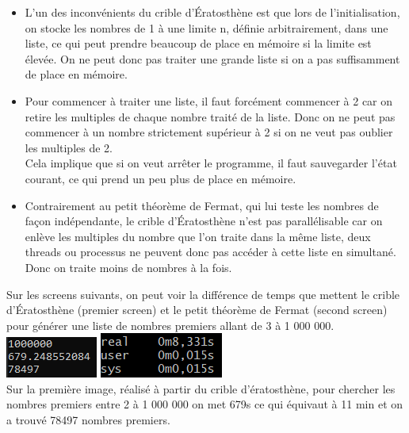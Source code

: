\begin{itemize}
\item L'un des inconvénients du crible d’Ératosthène est que lors de l'initialisation, on stocke les nombres de 1 à une limite n, définie arbitrairement, dans une liste, ce qui peut prendre beaucoup de place en mémoire si la limite est élevée. On ne peut donc pas traiter une grande liste si on a pas suffisamment de place en mémoire.\\

\item Pour commencer à traiter une liste, il faut forcément commencer à 2 car on retire les multiples de chaque nombre traité de la liste. Donc on ne peut pas commencer à un nombre strictement supérieur à 2 si on ne veut pas oublier les multiples de 2.\\
Cela implique que si on veut arrêter le programme, il faut sauvegarder l'état courant, ce qui prend un peu plus de place en mémoire.\\

\item Contrairement au petit théorème de Fermat, qui lui teste les nombres de façon indépendante, le crible d’Ératosthène n'est pas parallélisable car on enlève les multiples du nombre que l'on traite dans la même liste, deux threads ou processus ne peuvent donc pas accéder à cette liste en simultané. Donc on traite moins de nombres à la fois.\\
\end{itemize}

Sur les screens suivants, on peut voir la différence de temps que mettent le crible d’Ératosthène (premier screen) et le petit théorème de Fermat (second screen) pour générer une liste de nombres premiers allant de 3 à 1 000 000.\\

\includegraphics[scale=1]{images/eratosthene_1000000.png}
\includegraphics[scale=1]{images/comp_fermat.png}\\
Sur la première image, réalisé à partir du crible d'ératosthène, pour chercher les nombres premiers entre 2 à 1 000 000 on met 679s ce qui équivaut à 11 min et on a trouvé 78497 nombres premiers.\\
